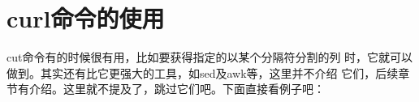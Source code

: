 \section{curl命令的使用}
\label{sec:curlCmd}

cut命令有的时候很有用，比如要获得指定的以某个分隔符分割的列
时，它就可以做到。其实还有比它更强大的工具，如sed及awk等，这里并不介绍
它们，后续章节有介绍。这里就不提及了，跳过它们吧。下面直接看例子吧：

